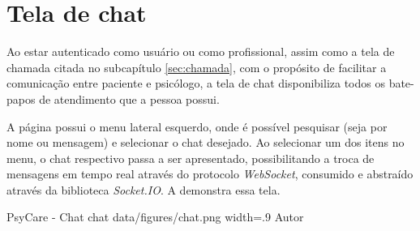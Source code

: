 \section{Tela de chat}
\label{sec:chat}

Ao estar autenticado como usuário ou como profissional, assim como a tela de chamada citada no subcapítulo \ref{sec:chamada}, com o propósito de facilitar a comunicação entre paciente e psicólogo, a tela de chat disponibiliza todos os bate-papos de atendimento que a pessoa possui. 

A página possui o menu lateral esquerdo, onde é possível pesquisar (seja por nome ou mensagem) e selecionar o chat desejado. Ao selecionar um dos itens no menu, o chat respectivo passa a ser apresentado, possibilitando a troca de mensagens em tempo real através do protocolo \textit{WebSocket}, consumido e abstraído através da biblioteca \textit{Socket.IO}. A  demonstra essa tela.

\image
    {PsyCare - Chat}
    {chat}
    {data/figures/chat.png}
    {width=.9\textwidth}
    {Autor}
